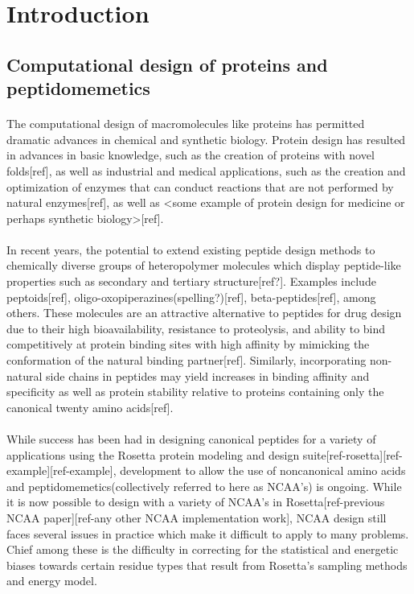 \section{Introduction}
\subsection{Computational design of proteins and peptidomemetics}
\paragraph{}
The computational design of macromolecules like proteins has permitted dramatic advances in chemical and synthetic biology.
Protein design has resulted in advances in basic knowledge, such as the creation of proteins with novel folds[ref], as well as industrial and medical applications, such as the creation and optimization of enzymes that can conduct reactions that are not performed by natural enzymes[ref], as well as <some example of protein design for medicine or perhaps synthetic biology>[ref].

\paragraph{}
In recent years, the potential to extend existing peptide design methods to chemically diverse groups of heteropolymer molecules which display peptide-like properties such as secondary and tertiary structure[ref?].
Examples include peptoids[ref], oligo-oxopiperazines(spelling?)[ref], beta-peptides[ref], among others.
These molecules are an attractive alternative to peptides for drug design due to their high bioavailability, resistance to proteolysis, and ability to bind competitively at protein binding sites with high affinity by mimicking the conformation of the natural binding partner[ref].
Similarly, incorporating non-natural side chains in peptides may yield increases in binding affinity and specificity as well as protein stability relative to proteins containing only the canonical twenty amino acids[ref].

\paragraph{}
While success has been had in designing canonical peptides for a variety of applications using the Rosetta protein modeling and design suite[ref-rosetta][ref-example][ref-example], development to allow the use of noncanonical amino acids and peptidomemetics(collectively referred to here as NCAA's) is ongoing.
While it is now possible to design with a variety of NCAA's in Rosetta[ref-previous NCAA paper][ref-any other NCAA implementation work], NCAA design still faces several issues in practice which make it difficult to apply to many problems.
Chief among these is the difficulty in correcting for the statistical and energetic biases towards certain residue types that result from Rosetta's sampling methods and energy model.

